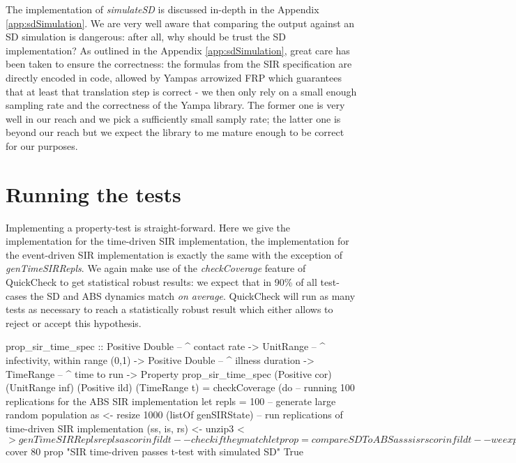 The implementation of \textit{simulateSD} is discussed in-depth in the Appendix \ref{app:sdSimulation}. We are very well aware that comparing the output against an SD simulation is dangerous: after all, why should be trust the SD implementation? As outlined in the Appendix \ref{app:sdSimulation}, great care has been taken to ensure the correctness: the formulas from the SIR specification are directly encoded in code, allowed by Yampas arrowized FRP which guarantees that at least that translation step is correct - we then only rely on a small enough sampling rate and the correctness of the Yampa library. The former one is very well in our reach and we pick a sufficiently small samply rate; the latter one is beyond our reach but we expect the library to me mature enough to be correct for our purposes.

\section{Running the tests}
Implementing a property-test is straight-forward. Here we give the implementation for the time-driven SIR implementation, the implementation for the event-driven SIR implementation is exactly the same with the exception of \textit{genTimeSIRRepls}. We again make use of the \textit{checkCoverage} feature of QuickCheck to get statistical robust results: we expect that in 90\% of all test-cases the SD and ABS dynamics match \textit{on average}. QuickCheck will run as many tests as necessary to reach a statistically robust result which either allows to reject or accept this hypothesis.

\begin{HaskellCode}
prop_sir_time_spec :: Positive Double  -- ^ contact rate
                   -> UnitRange        -- ^ infectivity, within range (0,1)
                   -> Positive Double  -- ^ illness duration
                   -> TimeRange        -- ^ time to run
                   -> Property
prop_sir_time_spec 
    (Positive cor) (UnitRange inf) (Positive ild) (TimeRange t) = checkCoverage (do
  -- running 100 replications for the ABS SIR implementation
  let repls = 100
  -- generate large random population
  as <- resize 1000 (listOf genSIRState)
  -- run replications of time-driven SIR implementation
  (ss, is, rs) <- unzip3 <$> genTimeSIRRepls repls as cor inf ild t
  -- check if they match 
  let prop = compareSDToABS as ss is rs cor inf ild t
  -- we expect 80%
  return $ cover 80 prop "SIR time-driven passes t-test with simulated SD" True
\end{HaskellCode}

